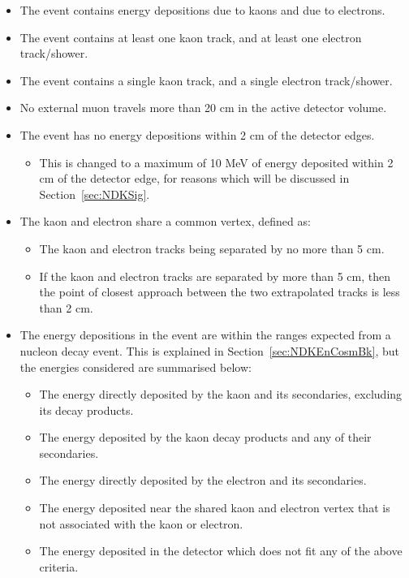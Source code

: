 \begin{itemize}
\item The event contains energy depositions due to kaons and due to electrons.
\item The event contains at least one kaon track, and at least one electron track/shower.
\item The event contains a single kaon track, and a single electron track/shower.
\item No external muon travels more than 20 cm in the active detector volume.
\item The event has no energy depositions within 2 cm of the detector edges.
  \begin{itemize}
  \item This is changed to a maximum of 10 MeV of energy deposited within 2 cm of the detector edge, for reasons which will be discussed in Section~\ref{sec:NDKSig}.
  \end{itemize}
\item The kaon and electron share a common vertex, defined as:
  \begin{itemize}
  \item The kaon and electron tracks being separated by no more than 5 cm.
  \item If the kaon and electron tracks are separated by more than 5 cm, then the point of closest approach between the two extrapolated tracks is less than 2 cm.
  \end{itemize}
\item The energy depositions in the event are within the ranges expected from a nucleon decay event. This is explained in Section~\ref{sec:NDKEnCosmBk}, but the energies considered are summarised below:
  \begin{itemize}
  \item The energy directly deposited by the kaon and its secondaries, excluding its decay products.
  \item The energy deposited by the kaon decay products and any of their secondaries.
  \item The energy directly deposited by the electron and its secondaries.
  \item The energy deposited near the shared kaon and electron vertex that is not associated with the kaon or electron.
  \item The energy deposited in the detector which does not fit any of the above criteria.
  \end{itemize}
\end{itemize}

